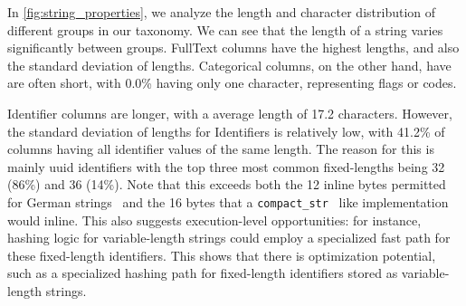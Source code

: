 In \cref{fig:string_properties}, we analyze the length and character distribution of different groups in our taxonomy.
We can see that the length of a string varies significantly between groups. FullText columns have the highest lengths,
and also the standard deviation of lengths. Categorical columns, on the other hand, have are often short, 
with 0.0\% having only one character, representing flags or codes. 

Identifier columns are longer, with a average length of 17.2 characters.
However, the standard deviation of lengths for Identifiers is relatively low, with 
41.2\% of columns having all identifier values of the same length. 
The reason for this is mainly uuid identifiers with the top three most common fixed-lengths being 32 (86\%) and 36 (14\%). 
Note that this exceeds both the 12 inline bytes permitted for German strings~\cite{neumann_umbra_2020} and the 16 
bytes that a \texttt{compact\_str}~\cite{timmerman_parkmycarcompact_str_2025} like implementation would inline. 
This also suggests execution-level opportunities: for instance, hashing logic for variable-length 
strings could employ a specialized fast path for these fixed-length identifiers. This shows that there is optimization
potential, such as a specialized hashing path for fixed-length identifiers stored as variable-length strings.

